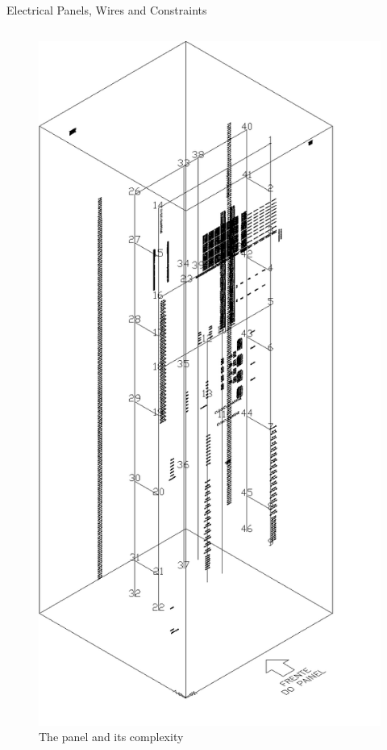 \documentclass{beamer}
\begin{document}
\begin{frame}{Electrical Panels, Wires and Constraints}
\begin{columns}
\begin{column}{0.5\textwidth}
\begin{figure}[!ht]
   \includegraphics[scale=0.25,keepaspectratio]{images/painel_modelo.pdf}
   
      \caption{The panel and its complexity}
     \end{figure}
  \end{column} %
 \end{columns}
  

\end{frame}
\end{document}
